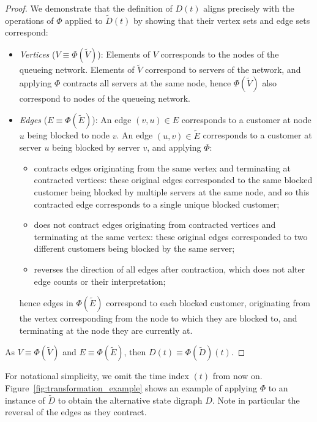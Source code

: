 \documentclass{article}
\begin{document}
\begin{proof}
We demonstrate that the definition of $D(t)$ aligns precisely with the
operations of $\Phi$ applied to $\tilde{D}(t)$ by showing that their vertex sets
and edge sets correspond:

\begin{itemize}
  \item \textit{Vertices} ($V \equiv \Phi(\tilde{V})$):
  Elements of $V$ corresponds to the nodes of the queueing network.
  Elements of $\tilde{V}$ correspond to servers of the network, and applying
  $\Phi$ contracts all servers at the same node, hence $\Phi(\tilde{V})$ also
  correspond to nodes of the queueing network.
  \item \textit{Edges} ($E \equiv \Phi(\tilde{E})$):
  An edge $(v, u) \in E$ corresponds to a customer at node $u$ being blocked to
  node $v$.
  An edge $(u, v) \in \tilde{E}$ corresponds to a customer at server $u$ being blocked by server $v$, and applying $\Phi$:
  \begin{itemize}
  	\item contracts edges originating from the same vertex and terminating at
  	contracted vertices: these original edges corresponded to the same blocked
  	customer being blocked by multiple servers at the same node, and so this
  	contracted edge corresponds to a single unique blocked customer;
  	\item does not contract edges originating from contracted vertices and
  	terminating at the same vertex: these original edges corresponded to two
  	different customers being blocked by the same server;
  	\item reverses the direction of all edges after contraction, which does not
  	alter edge counts or their interpretation;
  \end{itemize}
  hence edges in $\Phi(\tilde{E})$ correspond to each blocked customer,
  originating from the vertex corresponding from the node to which they are
  blocked to, and terminating at the node they are currently at.
\end{itemize}

As $V \equiv \Phi(\tilde{V})$ and $E \equiv \Phi(\tilde{E})$, then
$D(t) \equiv \Phi(\tilde{D})(t)$.
\end{proof}

For notational simplicity, we omit the time index $(t)$ from now on.
Figure~\ref{fig:transformation_example} shows an example of applying $\Phi$ to
an instance of $\tilde{D}$ to obtain the alternative state digraph $D$.
Note in particular the reversal of the edges as they contract.
\end{document}
